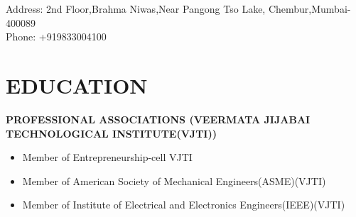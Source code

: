 \documentclass{article}
\begin{document}
\begin{flushleft}
\faHome  \hspace{1mm} Address: 2nd Floor,Brahma Niwas,Near Pangong Tso Lake, Chembur,Mumbai-400089 \\ 
\faPhone \hspace{1mm} Phone: +919833004100

\end{flushleft}


\section*{\large{\uppercase{education}}}


\vspace{3pt}
\textbf{\uppercase{Professional Associations (Veermata Jijabai Technological Institute(VJTI))}}
\begin{itemize}[noitemsep,nolistsep]
	\item Member of Entrepreneurship-cell VJTI
    \item Member of American Society of Mechanical Engineers(ASME)(VJTI)
    \item Member of Institute of Electrical and Electronics Engineers(IEEE)(VJTI)
\end{itemize}
\vspace{3pt}
\end{document}
